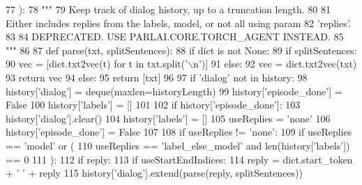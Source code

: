 \begin{DoxyCode}
77 ):
78     \textcolor{stringliteral}{"""}
79 \textcolor{stringliteral}{    Keep track of dialog history, up to a truncation length.}
80 \textcolor{stringliteral}{}
81 \textcolor{stringliteral}{    Either includes replies from the labels, model, or not all using param}
82 \textcolor{stringliteral}{    'replies'.}
83 \textcolor{stringliteral}{}
84 \textcolor{stringliteral}{    DEPRECATED. USE PARLAI.CORE.TORCH\_AGENT INSTEAD.}
85 \textcolor{stringliteral}{    """}
86 
87     \textcolor{keyword}{def }parse(txt, splitSentences):
88         \textcolor{keywordflow}{if} dict \textcolor{keywordflow}{is} \textcolor{keywordflow}{not} \textcolor{keywordtype}{None}:
89             \textcolor{keywordflow}{if} splitSentences:
90                 vec = [dict.txt2vec(t) \textcolor{keywordflow}{for} t \textcolor{keywordflow}{in} txt.split(\textcolor{stringliteral}{'\(\backslash\)n'})]
91             \textcolor{keywordflow}{else}:
92                 vec = dict.txt2vec(txt)
93             \textcolor{keywordflow}{return} vec
94         \textcolor{keywordflow}{else}:
95             \textcolor{keywordflow}{return} [txt]
96 
97     \textcolor{keywordflow}{if} \textcolor{stringliteral}{'dialog'} \textcolor{keywordflow}{not} \textcolor{keywordflow}{in} history:
98         history[\textcolor{stringliteral}{'dialog'}] = deque(maxlen=historyLength)
99         history[\textcolor{stringliteral}{'episode\_done'}] = \textcolor{keyword}{False}
100         history[\textcolor{stringliteral}{'labels'}] = []
101 
102     \textcolor{keywordflow}{if} history[\textcolor{stringliteral}{'episode\_done'}]:
103         history[\textcolor{stringliteral}{'dialog'}].clear()
104         history[\textcolor{stringliteral}{'labels'}] = []
105         useReplies = \textcolor{stringliteral}{'none'}
106         history[\textcolor{stringliteral}{'episode\_done'}] = \textcolor{keyword}{False}
107 
108     \textcolor{keywordflow}{if} useReplies != \textcolor{stringliteral}{'none'}:
109         \textcolor{keywordflow}{if} useReplies == \textcolor{stringliteral}{'model'} \textcolor{keywordflow}{or} (
110             useReplies == \textcolor{stringliteral}{'label\_else\_model'} \textcolor{keywordflow}{and} len(history[\textcolor{stringliteral}{'labels'}]) == 0
111         ):
112             \textcolor{keywordflow}{if} reply:
113                 \textcolor{keywordflow}{if} useStartEndIndices:
114                     reply = dict.start\_token + \textcolor{stringliteral}{' '} + reply
115                 history[\textcolor{stringliteral}{'dialog'}].extend(parse(reply, splitSentences))

\end{DoxyCode}
